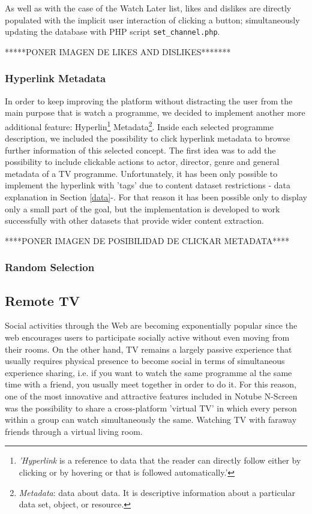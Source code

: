 \documentclass{acm_proc_article-sp}
\begin{document}
As well as with the case of the Watch Later list, likes and dislikes are directly populated with the implicit user interaction of clicking a button; simultaneously updating the database with PHP script \texttt{set\_channel.php}. 

*****PONER IMAGEN DE LIKES AND DISLIKES*******

\subsubsection{Hyperlink Metadata}

In order to keep improving the platform without distracting the user from the main purpose\cite{allen2012smashing} that is watch a programme, we decided to implement another more additional feature: Hyperlin\cite{wiki:hyper}\footnote{\textit{'Hyperlink} is a reference to data that the reader can directly follow either by clicking or by hovering or that is followed automatically.'} Metadata\footnote{\textit{Metadata}: data about data. It is descriptive information about a particular data set, object, or resource.}. Inside each selected programme description, we included the possibility to click hyperlink metadata to browse further information of this selected concept. The first idea was to add the possibility to include clickable actions to actor, director, genre and general metadata of a TV programme. Unfortunately, it has been only possible to implement the hyperlink with 'tags'  due to content dataset restrictions - data explanation in Section \ref{data}-. For that reason it has been possible only to display only a small part of the goal, but the implementation is developed to work successfully with other datasets that provide wider content extraction.

****PONER IMAGEN DE POSIBILIDAD DE CLICKAR METADATA****

\subsubsection{Random Selection}

\subsection{Remote TV}

Social activities through the Web are becoming exponentially popular since the web encourages users to  participate socially active without even moving from their rooms\cite{schopman2010notube}. On the other hand, TV remains a largely passive experience that usually requires physical presence to become social in terms of simultaneous experience sharing, i.e. if you want to watch the same programme al the same time with a friend, you usually meet together in order to do it. For this reason, one of the most innovative and attractive features included in Notube N-Screen was the possibility to share a cross-platform 'virtual TV' in which every person within a group can watch simultaneously the same. Watching TV with faraway friends through a virtual living room.
\end{document}

